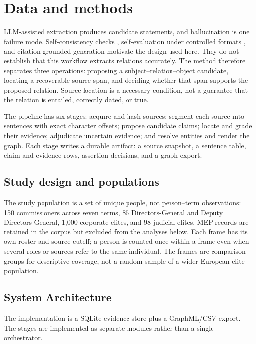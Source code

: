 \documentclass[11pt,a4paper]{article}
\begin{document}
\section{Data and methods}

LLM-assisted extraction produces candidate statements, and hallucination is one failure mode. Self-consistency checks \cite{manakul2023}, self-evaluation under controlled formats \cite{kadavath2022}, and citation-grounded generation \cite{zhang2024} motivate the design used here. They do not establish that this workflow extracts relations accurately. The method therefore separates three operations: proposing a subject--relation--object candidate, locating a recoverable source span, and deciding whether that span supports the proposed relation. Source location is a necessary condition, not a guarantee that the relation is entailed, correctly dated, or true.

The pipeline has six stages: acquire and hash sources; segment each source into sentences with exact character offsets; propose candidate claims; locate and grade their evidence; adjudicate uncertain evidence; and resolve entities and render the graph. Each stage writes a durable artifact: a source snapshot, a sentence table, claim and evidence rows, assertion decisions, and a graph export.

\subsection{Study design and populations}

The study population is a set of unique people, not person--term observations: 150 commissioners across seven terms, 85 Directors-General and Deputy Directors-General, 1{,}000 corporate elites, and 98 judicial elites. MEP records are retained in the corpus but excluded from the analyses below. Each frame has its own roster and source cutoff; a person is counted once within a frame even when several roles or sources refer to the same individual. The frames are comparison groups for descriptive coverage, not a random sample of a wider European elite population.

\subsection{System Architecture}

The implementation is a SQLite evidence store plus a GraphML/CSV export. The stages are implemented as separate modules rather than a single orchestrator.
\end{document}
